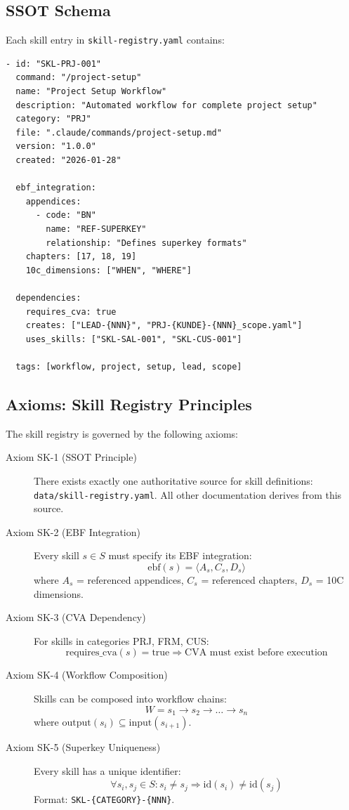 \subsection{SSOT Schema}

Each skill entry in \texttt{skill-registry.yaml} contains:

\begin{verbatim}
- id: "SKL-PRJ-001"
  command: "/project-setup"
  name: "Project Setup Workflow"
  description: "Automated workflow for complete project setup"
  category: "PRJ"
  file: ".claude/commands/project-setup.md"
  version: "1.0.0"
  created: "2026-01-28"

  ebf_integration:
    appendices:
      - code: "BN"
        name: "REF-SUPERKEY"
        relationship: "Defines superkey formats"
    chapters: [17, 18, 19]
    10c_dimensions: ["WHEN", "WHERE"]

  dependencies:
    requires_cva: true
    creates: ["LEAD-{NNN}", "PRJ-{KUNDE}-{NNN}_scope.yaml"]
    uses_skills: ["SKL-SAL-001", "SKL-CUS-001"]

  tags: [workflow, project, setup, lead, scope]
\end{verbatim}


\subsection{Axioms: Skill Registry Principles}
\label{sec:sk-axioms}

The skill registry is governed by the following axioms:

\begin{description}
\item[Axiom SK-1 (SSOT Principle)] There exists exactly one authoritative source for skill definitions:
\texttt{data/skill-registry.yaml}. All other documentation derives from this source.

\item[Axiom SK-2 (EBF Integration)] Every skill $s \in S$ must specify its EBF integration:
\[
\text{ebf}(s) = \langle A_s, C_s, D_s \rangle
\]
where $A_s$ = referenced appendices, $C_s$ = referenced chapters, $D_s$ = 10C dimensions.

\item[Axiom SK-3 (CVA Dependency)] For skills in categories PRJ, FRM, CUS:
\[
\text{requires\_cva}(s) = \text{true} \Rightarrow \text{CVA must exist before execution}
\]

\item[Axiom SK-4 (Workflow Composition)] Skills can be composed into workflow chains:
\[
W = s_1 \rightarrow s_2 \rightarrow \ldots \rightarrow s_n
\]
where $\text{output}(s_i) \subseteq \text{input}(s_{i+1})$.

\item[Axiom SK-5 (Superkey Uniqueness)] Every skill has a unique identifier:
\[
\forall s_i, s_j \in S: s_i \neq s_j \Rightarrow \text{id}(s_i) \neq \text{id}(s_j)
\]
Format: \texttt{SKL-\{CATEGORY\}-\{NNN\}}.
\end{description}

